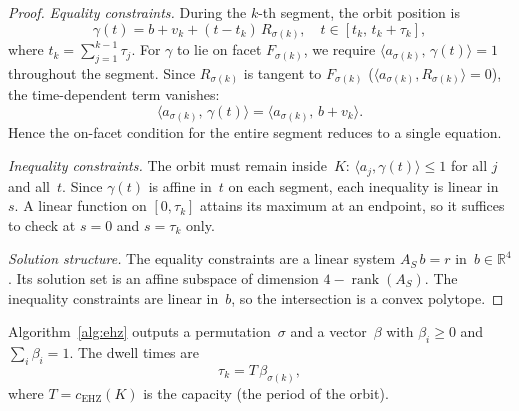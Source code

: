 \begin{proof}
\emph{Equality constraints.}
During the $k$-th segment, the orbit position is
\[
  \gamma(t) = b + v_k + (t - t_k)\, R_{\sigma(k)},
  \quad t \in [t_k,\, t_k + \tau_k],
\]
where $t_k = \sum_{j=1}^{k-1} \tau_j$.
For $\gamma$ to lie on facet $F_{\sigma(k)}$,
we require $\langle a_{\sigma(k)},\, \gamma(t) \rangle
= 1$ throughout the segment.
Since $R_{\sigma(k)}$ is tangent to $F_{\sigma(k)}$
($\langle a_{\sigma(k)}, R_{\sigma(k)} \rangle = 0$),
the time-dependent term vanishes:
\[
  \langle a_{\sigma(k)},\, \gamma(t) \rangle
  = \langle a_{\sigma(k)},\, b + v_k \rangle.
\]
Hence the on-facet condition for the entire segment
reduces to a single equation.

\emph{Inequality constraints.}
The orbit must remain inside~$K$:
$\langle a_j, \gamma(t) \rangle \leq 1$
for all $j$ and all~$t$.
Since $\gamma(t)$ is affine in~$t$ on each segment,
each inequality is linear in~$s$.
A linear function on $[0, \tau_k]$ attains its
maximum at an endpoint, so it suffices to
check at $s = 0$ and $s = \tau_k$ only.

\emph{Solution structure.}
The equality constraints are a linear system
$A_S\, b = r$ in~$b \in \mathbb{R}^4$.
Its solution set is an affine subspace of
dimension $4 - \operatorname{rank}(A_S)$.
The inequality constraints are linear in~$b$,
so the intersection is a convex polytope.
\end{proof}

\begin{remark}\label{rem:beta-to-tau}
Algorithm~\ref{alg:ehz} outputs a permutation~$\sigma$ and
a vector~$\beta$ with $\beta_i \geq 0$ and
$\sum_i \beta_i = 1$.
The dwell times are
\[
  \tau_k = T\, \beta_{\sigma(k)},
\]
where $T = c_{\mathrm{EHZ}}(K)$ is the capacity
(the period of the orbit).
\end{remark}

